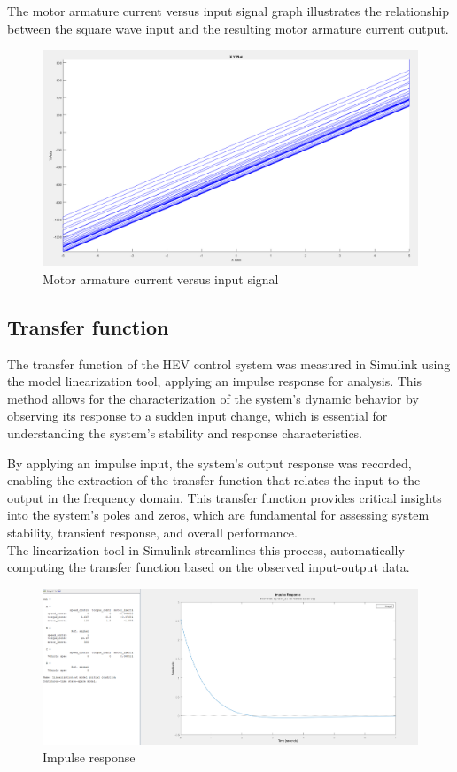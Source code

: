 \documentclass[a4paper, 12pt, english]{article}
\begin{document}
The motor armature current versus input signal graph illustrates the relationship between the square wave input and the resulting motor armature current output.
\begin{figure}[H]
    \centering
    \includegraphics[width=\linewidth]{images/current_input.png}
    \caption{Motor armature current versus input signal}
    \label{fig:Motor armature current versus input signal}
\end{figure}

\subsection{Transfer function}
The transfer function of the HEV control system was measured in Simulink using the model linearization tool, applying an impulse response for analysis. This method allows for the characterization of the system's dynamic behavior by observing its response to a sudden input change, which is essential for understanding the system's stability and response characteristics.

By applying an impulse input, the system's output response was recorded, enabling the extraction of the transfer function that relates the input to the output in the frequency domain. This transfer function provides critical insights into the system's poles and zeros, which are fundamental for assessing system stability, transient response, and overall performance. \\
\newline
The linearization tool in Simulink streamlines this process, automatically computing the transfer function based on the observed input-output data.
\begin{figure}[H]
    \centering
    \includegraphics[width=\linewidth]{images/impulse_response.png}
    \caption{Impulse response}
    \label{fig:Impulse response}
\end{figure}
\end{document}
